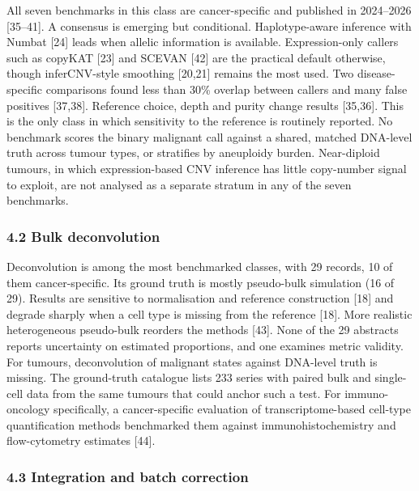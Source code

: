 \documentclass[11pt]{article}
\begin{document}
All seven benchmarks in this class are cancer-specific and published in
2024--2026 {[}35--41{]}. A consensus is emerging but conditional.
Haplotype-aware inference with Numbat {[}24{]} leads when allelic
information is available. Expression-only callers such as copyKAT
{[}23{]} and SCEVAN {[}42{]} are the practical default otherwise, though
inferCNV-style smoothing {[}20,21{]} remains the most used. Two
disease-specific comparisons found less than 30\% overlap between
callers and many false positives {[}37,38{]}. Reference choice, depth
and purity change results {[}35,36{]}. This is the only class in which
sensitivity to the reference is routinely reported. No benchmark scores
the binary malignant call against a shared, matched DNA-level truth
across tumour types, or stratifies by aneuploidy burden. Near-diploid
tumours, in which expression-based CNV inference has little copy-number
signal to exploit, are not analysed as a separate stratum in any of the
seven benchmarks.

\subsubsection{4.2 Bulk deconvolution}\label{bulk-deconvolution}

Deconvolution is among the most benchmarked classes, with 29 records, 10
of them cancer-specific. Its ground truth is mostly pseudo-bulk
simulation (16 of 29). Results are sensitive to normalisation and
reference construction {[}18{]} and degrade sharply when a cell type is
missing from the reference {[}18{]}. More realistic heterogeneous
pseudo-bulk reorders the methods {[}43{]}. None of the 29 abstracts
reports uncertainty on estimated proportions, and one examines metric
validity. For tumours, deconvolution of malignant states against
DNA-level truth is missing. The ground-truth catalogue lists 233 series
with paired bulk and single-cell data from the same tumours that could
anchor such a test. For immuno-oncology specifically, a cancer-specific
evaluation of transcriptome-based cell-type quantification methods
benchmarked them against immunohistochemistry and flow-cytometry
estimates {[}44{]}.

\subsubsection{4.3 Integration and batch
correction}\label{integration-and-batch-correction}
\end{document}
